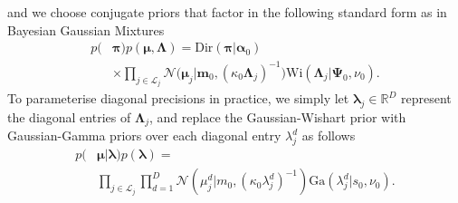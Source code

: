 \documentclass[letterpaper]{article} \usepackage{aaai20}  \usepackage{times}  \usepackage{helvet} \usepackage{courier}  \usepackage[hyphens]{url}  \usepackage{graphicx} \urlstyle{rm} \def\UrlFont{\rm}  \usepackage{graphicx}  \frenchspacing  \setlength{\pdfpagewidth}{8.5in}  \setlength{\pdfpageheight}{11in}  \nocopyright
\begin{document}
and we choose conjugate priors that factor in the following standard form as in Bayesian Gaussian Mixtures
\begin{equation}
\begin{aligned}
    p(&\boldsymbol{\pi})p(\boldsymbol{\mu},\boldsymbol{\Lambda}) = 
    \mathrm{Dir}(\boldsymbol{\pi}|\boldsymbol{\alpha}_{0}) \\ &\times \prod_{j\in \mathcal{L}_j} {\mathcal{{N}} \big(\boldsymbol{\mu}_j|\mathbf{m}_0, (\kappa_0\boldsymbol{\Lambda}_j)^{-1}\big)} \mathrm{Wi}(\boldsymbol{\Lambda}_j|\boldsymbol{\Psi}_{0},\nu_{0}).
\end{aligned}    
\end{equation}
To parameterise diagonal precisions in practice, we simply let $\boldsymbol{\lambda}_j \in \mathbb{R}^{D}$ represent the diagonal entries of $\boldsymbol{\Lambda}_j$, and replace the Gaussian-Wishart prior with Gaussian-Gamma priors over each diagonal entry $\lambda_{j}^d$ as follows
\begin{equation}\label{eq: Gaussian-Gamma}
\begin{aligned}
    p(&\boldsymbol{\mu}|\boldsymbol{\lambda})p(\boldsymbol{\lambda})= \\ & \prod_{j\in \mathcal{L}_j} \prod_{d=1}^{D} \mathcal{N}(\mu_{j}^d|m_{0}, (\kappa_{0}\lambda_{j}^d)^{-1})\mathrm{Ga}(\lambda_{j}^d|s_{0},\nu_{0}).
\end{aligned}
\end{equation}
\end{document}
